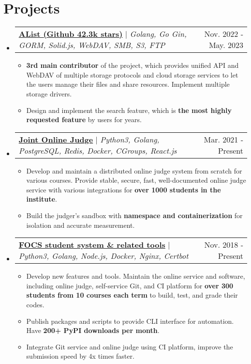 \documentclass[letterpaper,11pt]{article}
\makeatletter
\newcommand{\resumeItem}[1]{
  \item\small{
    {#1 \vspace{-2pt}}
  }
}
\newcommand{\resumeProjectHeader}[2]{
    \item
    \begin{tabular*}{0.98\textwidth}{l@{\extracolsep{\fill}}r}
      \small#1 & #2 \\
    \end{tabular*}\vspace{-7pt}
}
\newcommand{\resumeSubHeaderListStart}{\begin{itemize}[leftmargin=0.15in, label={}]}
\newcommand{\resumeSubHeaderListEnd}{\end{itemize}}
\newcommand{\resumeItemListStart}{\begin{itemize}}
\newcommand{\resumeItemListEnd}{\end{itemize}\vspace{-5pt}}
\makeatother
\begin{document}
\section{Projects}
    \resumeSubHeaderListStart
      \resumeProjectHeader
        {\href{https://github.com/alist-org/alist}{\textbf{AList (Github 42.3k stars)}} $|$ \emph{Golang, Go Gin, GORM, Solid.js, WebDAV, SMB, S3, FTP}}{Nov. 2022 - May. 2023}
        \resumeItemListStart
          \resumeItem{\textbf{3rd main contributor} of the project, which provides unified API and WebDAV of multiple storage protocols and cloud storage services to let the users manage their files and share resources. Implement multiple storage drivers.}
          \resumeItem{Design and implement the search feature, which is \textbf{the most highly requested feature} by users for years.}
        \resumeItemListEnd
      \resumeProjectHeader
        {\href{https://github.com/joint-online-judge}{\textbf{Joint Online Judge}} $|$ \emph{Python3, Golang, PostgreSQL, Redis, Docker, CGroups, React.js}}{Mar. 2021 - Present}
        \resumeItemListStart
          \resumeItem{Develop and maintain a distributed online judge system from scratch for various courses. Provide stable, secure, fast, well-documented online judge service with various integrations for \textbf{over 1000 students in the institute}.}
          \resumeItem{Build the judger's sandbox with \textbf{namespace and containerization} for isolation and accurate measurement.}
        \resumeItemListEnd
      \resumeProjectHeader
        {\href{https://gist.github.com/BoYanZh/fc4469c20fd6adf42c212114532aaac0}{\textbf{FOCS student system \& related tools}} $|$ \emph{Python3, Golang, Node.js, Docker, Nginx, Certbot}}{Nov. 2018 - Present}
        \resumeItemListStart
          \resumeItem{Develop new features and tools. Maintain the online service and software, including online judge, self-service Git, and CI platform for \textbf{over 300 students from 10 courses each term} to build, test, and grade their codes.}
          \resumeItem{Publish packages and scripts to provide CLI interface for automation. Have \textbf{200+ PyPI downloads per month}. \\}
          \resumeItem{Integrate Git service and online judge using CI platform, improve the submission speed by 4x times faster.}
        \resumeItemListEnd
    \resumeSubHeaderListEnd
\end{document}
